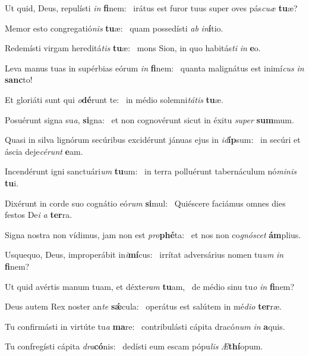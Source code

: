 \item Ut quid, Deus, repulísti \textit{in} \textbf{fi}nem:~\psstar{} irátus est furor tuus super oves pás\textit{cuæ} \textbf{tu}æ?
\item Memor esto congregatió\textit{nis} \textbf{tu}æ:~\psstar{} quam possedísti \textit{ab} \textit{in}\textbf{í}tio.
\item Redemísti virgam hereditá\textit{tis} \textbf{tu}æ:~\psstar{} mons Sion, in quo habitás\textit{ti} \textit{in} \textbf{e}o.
\item Leva manus tuas in supérbias eórum \textit{in} \textbf{fi}nem:~\psstar{} quanta malignátus est inimí\textit{cus} \textit{in} \textbf{sanc}to!
\item Et gloriáti sunt qui \textit{o}\textbf{dé}runt te:~\psstar{} in médio solemni\textit{tátis} \textbf{tu}æ.
\item Posuérunt signa su\textit{a}, \textbf{si}gna:~\psstar{} et non cognovérunt sicut in éxitu \textit{super} \textbf{sum}mum.
\item Quasi in silva lignórum secúribus excidérunt jánuas ejus in \textit{id}\textbf{íp}sum:~\psstar{} in secúri et áscia deje\textit{cérunt} \textbf{e}am.
\item Incendérunt igni sanctuári\textit{um} \textbf{tu}um:~\psstar{} in terra polluérunt tabernáculum nó\textit{minis} \textbf{tu}i.
\item Dixérunt in corde suo cognátio eó\textit{rum} \textbf{si}mul:~\psstar{} Quiéscere faciámus omnes dies festos De\textit{i} \textit{a} \textbf{ter}ra.
\item Signa nostra non vídimus, jam non est \textit{pro}\textbf{phé}ta:~\psstar{} et nos non co\textit{gnóscet} \textbf{ám}plius.
\item Usquequo, Deus, improperábit in\textit{i}\textbf{mí}cus:~\psstar{} irrítat adversárius nomen tu\textit{um} \textit{in} \textbf{fi}nem?
\item Ut quid avértis manum tuam, et déxte\textit{ram} \textbf{tu}am,~\psstar{} de médio sinu tu\textit{o} \textit{in} \textbf{fi}nem?
\item Deus autem Rex noster an\textit{te} \textbf{sǽ}cula:~\psstar{} operátus est salútem in mé\textit{dio} \textbf{ter}ræ.
\item Tu confirmásti in virtúte tu\textit{a} \textbf{ma}re:~\psstar{} contribulásti cápita dracó\textit{num} \textit{in} \textbf{a}quis.
\item Tu confregísti cápita \textit{dra}\textbf{có}nis:~\psstar{} dedísti eum escam pópu\textit{lis} \textit{Æ}\textbf{thí}opum.
